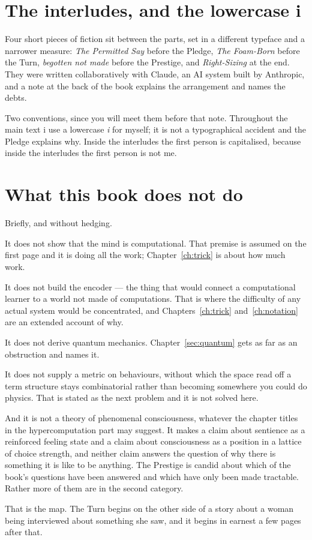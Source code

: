 \section*{The interludes, and the lowercase i}

Four short pieces of fiction sit between the parts, set in a
different typeface and a narrower measure: \emph{The Permitted Say}
before the Pledge, \emph{The Foam-Born} before the Turn,
\emph{begotten not made} before the Prestige, and
\emph{Right-Sizing} at the end.
They were written collaboratively with Claude, an AI system built
by Anthropic, and a note at the back of the book explains the
arrangement and names the debts.

Two conventions, since you will meet them before that note.
Throughout the main text i use a lowercase \emph{i} for myself; it
is not a typographical accident and the Pledge explains why.
Inside the interludes the first person is capitalised, because
inside the interludes the first person is not me.

\section*{What this book does not do}

Briefly, and without hedging.

It does not show that the mind is computational.
That premise is assumed on the first page and it is doing all the
work; Chapter~\ref{ch:trick} is about how much work.

It does not build the encoder --- the thing that would connect a
computational learner to a world not made of computations.
That is where the difficulty of any actual system would be
concentrated, and Chapters~\ref{ch:trick}
and~\ref{ch:notation} are an extended account of why.

It does not derive quantum mechanics.
Chapter~\ref{sec:quantum} gets as far as an obstruction and names
it.

It does not supply a metric on behaviours, without which the space
read off a term structure stays combinatorial rather than
becoming somewhere you could do physics.
That is stated as the next problem and it is not solved here.

And it is not a theory of phenomenal consciousness, whatever the
chapter titles in the hypercomputation part may suggest.
It makes a claim about sentience as a reinforced feeling state and
a claim about consciousness as a position in a lattice of choice
strength, and neither claim answers the question of why there is
something it is like to be anything.
The Prestige is candid about which of the book's questions have
been answered and which have only been made tractable.
Rather more of them are in the second category.

\bigskip
\noindent
That is the map.
The Turn begins on the other side of a story about a woman being
interviewed about something she saw, and it begins in earnest a few
pages after that.

\renewcommand{\thefigure}{\thechapter.\arabic{figure}}\setcounter{figure}{0}
